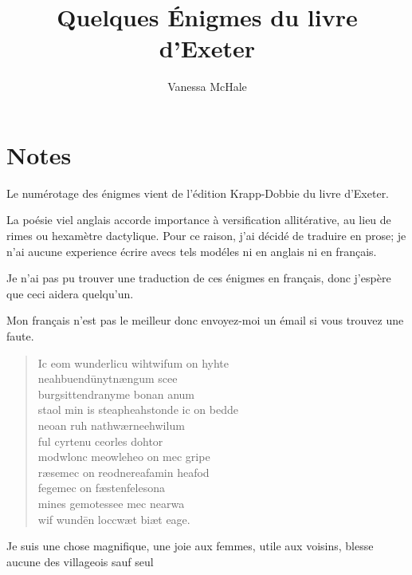 \documentclass{article}
\newcommand{\attrib}[1]{%
\nopagebreak{\raggedleft\footnotesize #1\par}}
\begin{document}
\title{Quelques \'Enigmes du livre d'Exeter}
\author{Vanessa McHale}
\maketitle

\section{Notes}
Le num\'erotage des \'enigmes vient de l'\'edition Krapp-Dobbie du livre d'Exeter.

La po\'esie viel anglais accorde importance \`a versification allit\'erative, au lieu de rimes ou hexam\`etre dactylique. Pour ce raison, j'ai d\'ecid\'e de traduire en prose; je n'ai aucune experience \'ecrire avecs tels mod\'eles ni en anglais ni en fran\c{c}ais. 

Je n'ai pas pu trouver une traduction de ces \'enigmes en fran\c{c}ais, donc j'esp\`ere que ceci aidera quelqu'un. 

Mon fran\c{c}ais n'est pas le meilleur donc envoyez-moi un \'email si vous trouvez une faute. 

\begin{verse}
Ic eom wunderlicu wiht\qquad     wifum on hyhte\\
neahbuend\=unyt\qquad     n\ae ngum sce\th\th e\\
burgsittendra\qquad     nym\th e bonan anum\\
sta\th ol min is steapheah\qquad     stonde ic on bedde\\
neo\th an ruh nathw\ae r\qquad     ne\th e\dh hwilum\\
ful cyrtenu \qquad     ceorles dohtor\\
modwlonc meowle\qquad     \TH  heo on mec gripe\dh\\
r\ae se\dh mec on reodne\qquad     reafa\dh min heafod\\
fege\dh mec on f\ae sten\qquad     fele\th sona\\
mines gemotes\qquad     se\th e mec nearwa\dh\\
wif wund\=en locc\qquad     w\ae t bi\dh \th\ae t eage.
\end{verse}
\attrib{Livre d'Exeter}

Je suis une chose magnifique,    une joie aux femmes,
utile aux voisins,    blesse aucune
des villageois    sauf seul 
\end{document}

